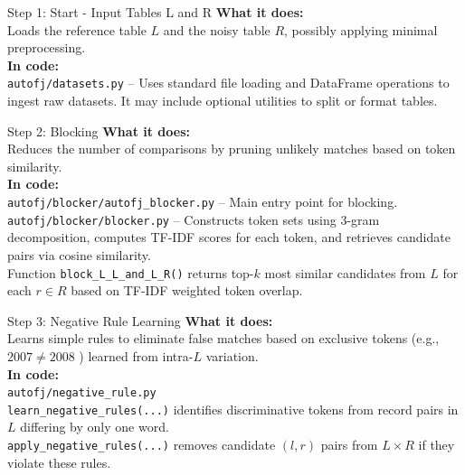 \documentclass[8pt]{beamer} %
\begin{document}
\begin{frame}{Step 1: Start - Input Tables L and R}
	\textbf{What it does:} \\
	Loads the reference table $L$ and the noisy table $R$, possibly applying minimal preprocessing. \\[1ex]
	\textbf{In code:} \\
	\texttt{autofj/datasets.py} – Uses standard file loading and DataFrame operations to ingest raw datasets. It may include optional utilities to split or format tables.
\end{frame}

\begin{frame}{Step 2: Blocking}
	\textbf{What it does:} \\
	Reduces the number of comparisons by pruning unlikely matches based on token similarity. \\[1ex]
	\textbf{In code:} \\
	\texttt{autofj/blocker/autofj\_blocker.py} – Main entry point for blocking. \\
	\texttt{autofj/blocker/blocker.py} – Constructs token sets using 3-gram decomposition, computes TF-IDF scores for each token, and retrieves candidate pairs via cosine similarity. \\
	Function \texttt{block\_L\_L\_and\_L\_R()} returns top-$k$ most similar candidates from $L$ for each $r \in R$ based on TF-IDF weighted token overlap.
\end{frame}
%
\begin{frame}{Step 3: Negative Rule Learning}
	\textbf{What it does:} \\
	Learns simple rules to eliminate false matches based on exclusive tokens (e.g., $2007 \ne 2008$ ) learned from intra-$L$ variation. \\[1ex]
	\textbf{In code:} \\
	\texttt{autofj/negative\_rule.py} \\
	\texttt{learn\_negative\_rules(...)} identifies discriminative tokens from record pairs in $L$ differing by only one word. \\
	\texttt{apply\_negative\_rules(...)} removes candidate $(l, r)$ pairs from $L \times R$ if they violate these rules.
\end{frame}
\end{document}
